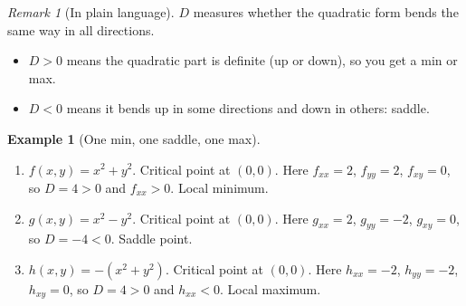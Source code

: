 \documentclass[12pt]{article}
\numberwithin{equation}{section}
\theoremstyle{plain}
\theoremstyle{definition}
\newtheorem{example}[theorem]{Example}
\theoremstyle{remark}
\newtheorem{remark}[theorem]{Remark}
\begin{document}
\begin{remark}[In plain language]
$D$ measures whether the quadratic form bends the same way in all directions.  
\begin{itemize}
\item $D>0$ means the quadratic part is definite (up or down), so you get a min or max.
\item $D<0$ means it bends up in some directions and down in others: saddle.
\end{itemize}
\end{remark}

\begin{example}[One min, one saddle, one max]
\begin{enumerate}[label=(\alph*)]
\item $f(x,y)=x^2+y^2$. Critical point at $(0,0)$. Here $f_{xx}=2$, $f_{yy}=2$, $f_{xy}=0$, so $D=4>0$ and $f_{xx}>0$. Local minimum.
\item $g(x,y)=x^2-y^2$. Critical point at $(0,0)$. Here $g_{xx}=2$, $g_{yy}=-2$, $g_{xy}=0$, so $D=-4<0$. Saddle point.
\item $h(x,y)=-(x^2+y^2)$. Critical point at $(0,0)$. Here $h_{xx}=-2$, $h_{yy}=-2$, $h_{xy}=0$, so $D=4>0$ and $h_{xx}<0$. Local maximum.
\end{enumerate}
\end{example}
\end{document}
